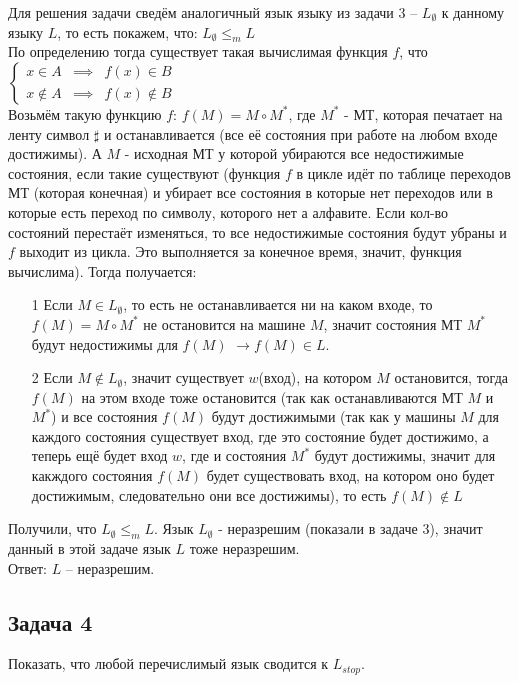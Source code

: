 \documentclass[a4paper,12pt]{article} %
\begin{document}
Для решения задачи сведём аналогичный язык языку из задачи 3 -- $L_\emptyset$  к данному языку $ L $, то есть покажем, что: $ L_\emptyset \leq_m L $ \\
По определению тогда существует такая вычислимая функция $f$, что\\
 $\left \{\begin{array}{ccc} x \in A & \implies & f(x) \in B \\ x \not \in A & \implies & f(x) \not \in B \end{array}\right.$\\
Возьмём такую функцию $ f $: $ f(M) = M \circ M^\ast $, где $ M^\ast $ - МТ, которая печатает на ленту символ $ \sharp $ и останавливается (все её состояния при работе на любом входе достижимы). А $ M $ - исходная МТ у которой убираются все недостижимые состояния, если такие существуют (функция $ f $ в цикле идёт по таблице переходов МТ (которая конечная) и убирает все состояния в которые нет переходов или в которые есть переход по символу, которого нет а алфавите. Если кол-во состояний перестаёт изменяться, то все недостижимые состояния будут убраны и $ f $ выходит из цикла. Это выполняется за конечное время, значит, функция вычислима). Тогда получается:
\begin{itemize}
\item[1] Если $ M \in L_\emptyset$, то есть не останавливается ни на каком входе, то $ f(M) = M \circ M^\ast $ не остановится на машине $ M $, значит состояния МТ $ M^\ast $ будут недостижимы для $ f(M)$ $ \longrightarrow f(M) \in L $.
\item[2] Если $ M \notin L_\emptyset$, значит существует $ w $(вход), на котором $ M $ остановится, тогда $ f(M) $ на этом входе тоже остановится (так как останавливаются МТ $ M $ и $ M^\ast$) и все состояния $ f(M) $ будут достижимыми (так как у машины $ M $ для каждого состояния существует вход, где это состояние будет достижимо, а теперь ещё будет вход $ w $, где и состояния $ M^\ast$ будут достижимы, значит для какждого состояния $ f(M) $ будет существовать вход, на котором оно будет достижимым, следовательно они все достижимы), то есть $ f(M) \notin L $
\end{itemize}
Получили, что $L_\emptyset \leq_m L$. Язык $L_\emptyset$ - неразрешим (показали в задаче 3), значит данный в этой задаче язык $ L $ тоже неразрешим.\\
Ответ: $ L $ -- неразрешим.




\subsection*{Задача 4}
Показать, что любой перечислимый язык сводится к $L_{stop}$.\\
\end{document}
